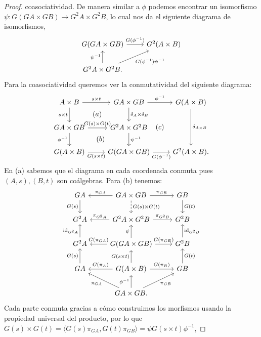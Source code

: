 \begin{proof}
  coasociatividad. De manera similar a $\phi$ podemos encontrar un isomorfismo $\psi\colon G(GA\times GB) \to G^2A\times G^2B$,
  lo cual nos da el siguiente diagrama de isomorfismos,
  \begin{equation*}
    \begin{tikzcd}
      G(GA\times GB)\ar{r}{G(\phi^{-1})} & G^2(A\times B) \\
      G^2A\times G^2B.\ar{u}{\psi^{-1}}\ar[swap]{ur}{G(\phi^{-1})\psi^{-1}}
    \end{tikzcd}
  \end{equation*}
  Para la coasociatividad queremos ver la conmutatividad del siguiente diagrama:
  \begin{equation*}
    \begin{tikzcd}
      A\times B\ar[phantom]{rd}{(a)}\ar{r}{s\times t}\ar[swap]{d}{s\times t} & GA\times GB\ar{r}{\phi^{-1}}\ar{d}{\delta_A\times \delta_B}
        & G(A\times B)\ar{dd}{\delta_{A\times B}} \\
      GA\times GB\ar{r}{G(s)\times G(t)}\ar[swap]{d}{\phi^{-1}} & G^2A\times G^2B\ar{d}{\psi^{-1}} \\
      G(A\times B)\ar[phantom]{ur}{(b)}\ar[swap]{r}{G(s\times t)} & G(GA\times GB)\ar[phantom]{uur}{(c)}\ar[swap]{r}{G(\phi^{-1})} & G^2(A\times B).
    \end{tikzcd}
  \end{equation*}
  En (a) sabemos que el diagrama en cada coordenada conmuta pues $(A,s),(B,t)$ son coálgebras. 
  Para (b) tenemos:
  \begin{equation*}
    \begin{tikzcd}
      GA\ar[swap]{d}{G(s)} & GA\times GB\ar[swap]{l}{\pi_{GA}}\ar{r}{\pi_{GB}}\ar[dashed]{d}{G(s)\times G(t)} & GB\ar{d}{G(t)}\\
      G^2A & G^2A\times G^2B\ar[swap]{l}{\pi_{G^2A}}\ar{r}{\pi_{G^2B}} & G^2B \\
      G^2A\ar{u}{\id_{G^2A}} & G(GA\times GB)\ar[swap]{l}{G(\pi_{GA})}\ar{u}{\psi}\ar{r}{G(\pi_{GB})} & G^2B\ar[swap]{u}{\id_{G^2B}} \\
      GA\ar{u}{G(s)} & G(A\times B)\ar[swap]{l}{G(\pi_A)}\ar{u}{G(s\times t)}\ar{r}{G(\pi_B)} & GB\ar[swap]{u}{G(t)} \\
      & GA\times GB.\ar{ul}{\pi_{GA}}\ar{u}{\phi^{-1}}\ar[swap]{ur}{\pi_{GB}}
    \end{tikzcd}
  \end{equation*}
  Cada parte conmuta gracias a cómo construimos los morfismos usando la propiedad universal del producto,
  por lo que $G(s)\times G(t)=\langle G(s)\pi_{GA},G(t)\pi_{GB} \rangle = \psi G(s\times t)\phi^{-1}$,

\end{proof}
